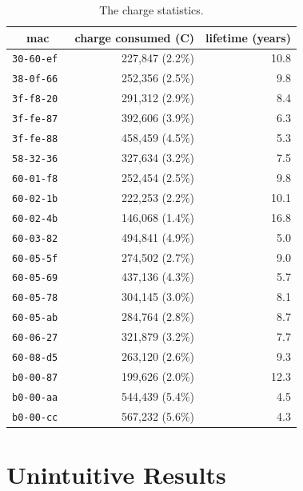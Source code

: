 \documentclass{sig-alternate}
\begin{document}
\begin{table}
  \begin{tabular}{|c|r|r|}
     \hline
     mac            & charge consumed (C) & lifetime (years)\\
     \hline
     \tt{30-60-ef}  & 227,847 (2.2\%)      & 10.8 \\
     \tt{38-0f-66}  & 252,356 (2.5\%)      &  9.8 \\
     \tt{3f-f8-20}  & 291,312 (2.9\%)      &  8.4 \\
     \tt{3f-fe-87}  & 392,606 (3.9\%)      &  6.3 \\
     \tt{3f-fe-88}  & 458,459 (4.5\%)      &  5.3 \\
     \tt{58-32-36}  & 327,634 (3.2\%)      &  7.5 \\
     \tt{60-01-f8}  & 252,454 (2.5\%)      &  9.8 \\
     \tt{60-02-1b}  & 222,253 (2.2\%)      & 10.1 \\
     \tt{60-02-4b}  & 146,068 (1.4\%)      & 16.8 \\
     \tt{60-03-82}  & 494,841 (4.9\%)      &  5.0 \\
     \tt{60-05-5f}  & 274,502 (2.7\%)      &  9.0 \\
     \tt{60-05-69}  & 437,136 (4.3\%)      &  5.7 \\
     \tt{60-05-78}  & 304,145 (3.0\%)      &  8.1 \\
     \tt{60-05-ab}  & 284,764 (2.8\%)      &  8.7 \\
     \tt{60-06-27}  & 321,879 (3.2\%)      &  7.7 \\
     \tt{60-08-d5}  & 263,120 (2.6\%)      &  9.3 \\
     \tt{b0-00-87}  & 199,626 (2.0\%)      & 12.3 \\
     \tt{b0-00-aa}  & 544,439 (5.4\%)      &  4.5 \\
     \tt{b0-00-cc}  & 567,232 (5.6\%)      &  4.3 \\
     \hline
  \end{tabular}
  \caption{The charge statistics.}
  \label{tab:stats_charge}
\end{table}

\section{Unintuitive Results}
\label{sec:unintuitive}

\end{document}
